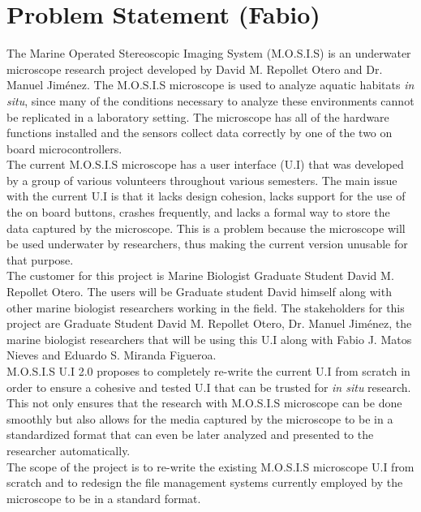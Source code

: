  \section{Problem Statement (Fabio)}
 The Marine Operated Stereoscopic Imaging System (M.O.S.I.S) is an underwater microscope research project developed by David M. Repollet Otero and Dr. Manuel Jiménez\cite{fernandoguzman3UIMosis2023}\cite{Fabiomatos999}. The M.O.S.I.S microscope is used to analyze aquatic habitats \textit{in situ}, since many of the conditions necessary to analyze these environments cannot be replicated in a laboratory setting. The microscope has all of the hardware functions installed and the sensors collect data correctly by one of the two on board microcontrollers.\\ The current M.O.S.I.S microscope has a user interface (U.I) that was developed by a group of various volunteers throughout various semesters. The main issue with the current U.I is that it lacks design cohesion, lacks support for the use of the on board buttons, crashes frequently, and lacks a formal way to store the data captured by the microscope. This is a problem because the microscope will be used underwater by researchers, thus making the current version unusable for that purpose.\\
 The customer for this project is Marine Biologist Graduate Student David M. Repollet Otero. The users will be Graduate student David himself along with other marine biologist researchers working in the field. The stakeholders for this project are Graduate Student David M. Repollet Otero, Dr. Manuel Jiménez, the marine biologist researchers that will be using this U.I along with Fabio J. Matos Nieves and Eduardo S. Miranda Figueroa.\\
 M.O.S.I.S U.I 2.0 proposes to completely re-write the current U.I from scratch in order to ensure a cohesive and tested U.I that can be trusted for \textit{in situ} research. This not only ensures that the research with M.O.S.I.S microscope can be done smoothly but also allows for the media captured by the microscope to be in a standardized format that can even be later analyzed and presented to the researcher automatically.\\
The scope of the project is to re-write the existing M.O.S.I.S microscope U.I from scratch and to redesign the file management systems currently employed by the microscope to be in a standard format.